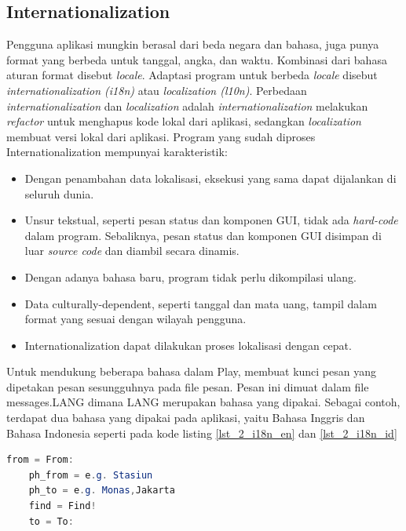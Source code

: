 

\subsection{Internationalization}
Pengguna aplikasi mungkin berasal dari beda negara dan bahasa, juga punya format yang berbeda untuk tanggal, angka, dan waktu. Kombinasi dari bahasa aturan format disebut \textit{locale}. Adaptasi program untuk berbeda \textit{locale} disebut \textit{internationalization (i18n)} atau \textit{localization (l10n)}. Perbedaan \textit{internationalization} dan \textit{localization} adalah \textit{internationalization} melakukan \textit{refactor} untuk menghapus kode lokal dari aplikasi, sedangkan \textit{localization} membuat versi lokal dari aplikasi. Program yang sudah diproses Internationalization mempunyai karakteristik:

\begin{itemize}
	\item Dengan penambahan data lokalisasi, eksekusi yang sama dapat dijalankan di seluruh dunia.
	\item Unsur tekstual, seperti pesan status dan komponen GUI, tidak ada \textit{hard-code} dalam program. Sebaliknya, pesan status dan komponen GUI disimpan di luar \textit{source code} dan diambil secara dinamis.
	\item Dengan adanya bahasa baru, program tidak perlu dikompilasi ulang.
	\item Data culturally-dependent, seperti tanggal dan mata uang, tampil dalam format yang sesuai dengan wilayah pengguna.
	\item Internationalization dapat dilakukan proses lokalisasi dengan cepat.
\end{itemize}

Untuk mendukung beberapa bahasa dalam Play, membuat kunci pesan yang dipetakan pesan sesungguhnya pada file pesan. Pesan ini dimuat dalam file messages.LANG dimana LANG merupakan bahasa yang dipakai. Sebagai contoh, terdapat dua bahasa yang dipakai pada aplikasi, yaitu Bahasa Inggris dan Bahasa Indonesia seperti pada kode listing \ref{lst_2_i18n_en} dan \ref{lst_2_i18n_id}

\begin{lstlisting}[caption=Contoh messages.en untuk i18n,label = {lst_2_i18n_en},language=Java]
	from = From:
	ph_from = e.g. Stasiun
	ph_to = e.g. Monas,Jakarta
	find = Find!
	to = To:
\end{lstlisting}

